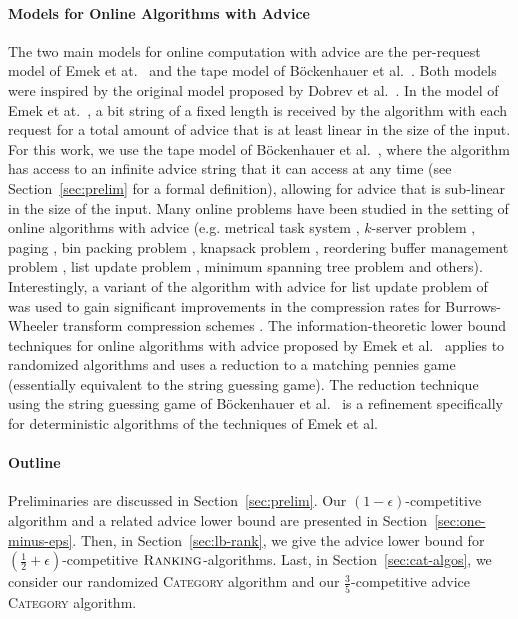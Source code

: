 \documentclass[a4paper]{article}
\newcommand{\Rank}{\textsc{Ranking}}
\begin{document}
\paragraph*{Models for Online Algorithms with Advice}
The two main models for online computation with advice are the per-request model of Emek
et at.~\cite{efkr11} and the tape model of B\"{o}ckenhauer et al.~\cite{bkkkm09}.
Both models were inspired by the original model proposed by Dobrev et al.~\cite{DRP2008}.
In the model of Emek et at.~\cite{efkr11}, a bit string of a fixed length is received by the
algorithm with each request for a total amount of advice that is at least linear in the size of
the input. For this work, we use the tape model of B\"{o}ckenhauer et al.~\cite{bkkkm09}, where the
algorithm has access to an infinite advice string that it can access at any time (see
Section~\ref{sec:prelim} for a formal definition), allowing for advice that is sub-linear in
the size of the input. Many online problems have been studied in the setting of online algorithms
with advice (e.g. metrical task system \cite{efkr11}, $k$-server
problem \cite{efkr11,bkkk11,RenaultR15,GuptaKL13}, paging \cite{DRP2008,bkkkm09}, bin packing
problem \cite{RenaultRS15,BoyarKLL16,adkrr15}, knapsack problem \cite{BockKKR14}, reordering buffer management
problem \cite{arrs13}, list update problem \cite{BoyarKLL14}, minimum spanning tree
problem \cite{BianchiBBKP16} and others). Interestingly, a variant of the algorithm with advice for
list update problem of \cite{BoyarKLL14} was used to gain significant improvements in the compression
rates for Burrows-Wheeler transform compression schemes \cite{KamaliL14}.
The information-theoretic lower bound techniques for online algorithms with advice proposed by
Emek et al.~\cite{efkr11} applies to randomized algorithms and uses a reduction to a matching
pennies game (essentially equivalent to the string guessing game). The reduction technique using the string
guessing game of B\"{o}ckenhauer et al.~\cite{bhkkss14} is a refinement specifically for deterministic
algorithms of the techniques of Emek et al.


\paragraph*{Outline} Preliminaries are discussed in Section~\ref{sec:prelim}. Our
$(1-\epsilon)$-competitive algorithm and a related advice lower bound are presented in
Section~\ref{sec:one-minus-eps}. Then, in Section~\ref{sec:lb-rank}, we give the advice lower
bound for $(\frac{1}{2} + \epsilon)$-competitive $\Rank$-algorithms. Last, in Section~\ref{sec:cat-algos}, we consider our randomized \textsc{Category} algorithm
and our $\frac{3}{5}$-competitive advice \textsc{Category} algorithm.
\end{document}
